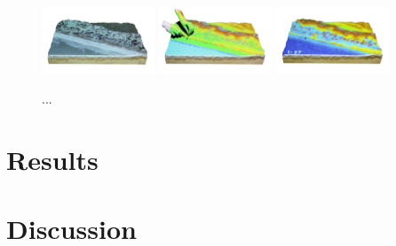 \documentclass[prodmode,acmtochi]{acmsmall} %
\begin{document}
\begin{figure}[ht!]
\begin{center}
		\includegraphics[width=0.3\textwidth]{images/tl_coastal_1s.png}
		\includegraphics[width=0.3\textwidth]{images/tl_coastal_3s.png}
		\includegraphics[width=0.3\textwidth]{images/tl_coastal_4s.png}
	\caption{...}
	\label{fig:coastal_game}
\end{center}
\end{figure}

\section{Results}

\section{Discussion}











	
\end{document}
